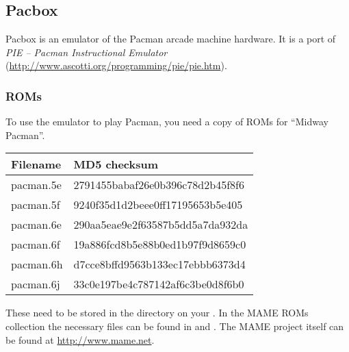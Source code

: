 \subsection{Pacbox}
Pacbox is an emulator of the Pacman arcade machine hardware. It is a port of
\emph{PIE -- Pacman Instructional Emulator}
(\url{http://www.ascotti.org/programming/pie/pie.htm}).

\subsubsection{ROMs}
To use the emulator to play Pacman, you need a copy of ROMs for 
``Midway Pacman''.
\begin{center}
  \begin{tabular}{ll}\toprule
    \textbf{Filename} & \textbf{MD5 checksum}\\\midrule
    pacman.5e & 2791455babaf26e0b396c78d2b45f8f6\\
    pacman.5f & 9240f35d1d2beee0ff17195653b5e405\\
    pacman.6e & 290aa5eae9e2f63587b5dd5a7da932da\\
    pacman.6f & 19a886fcd8b5e88b0ed1b97f9d8659c0\\
    pacman.6h & d7cce8bffd9563b133ec17ebbb6373d4\\
    pacman.6j & 33c0e197be4c787142af6c3be0d8f6b0\\\bottomrule
  \end{tabular}
\end{center}

These need to be stored in the  directory on your 
\dap. In the MAME ROMs collection the necessary files can be found in 
 and . The MAME project itself can be 
found at \url{http://www.mame.net}.

